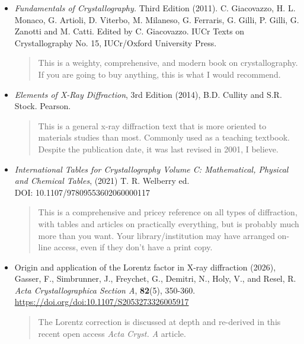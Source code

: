 \begin{itemize}
\item \textit{Fundamentals of Crystallography.} Third Edition (2011). C. Giacovazzo, H. L. Monaco, G. Artioli, D. Viterbo, M. Milaneso, G. Ferraris, G. Gilli, P. Gilli, G. Zanotti and M. Catti. Edited by C. Giacovazzo. IUCr Texts on Crystallography No. 15, IUCr/Oxford University Press.
\begin{quote}
This is a weighty, comprehensive, and modern book on crystallography. If you are going to buy anything, this is what I would recommend. 
\end{quote}

\item\textit{Elements of X-Ray Diffraction}, 3rd Edition (2014), B.D. Cullity and S.R. Stock. Pearson. 
\begin{quote}
This is a general x-ray diffraction text that is more oriented to materials studies than most. Commonly used as a teaching textbook. Despite the publication date, it was last revised in 2001, I believe.
\end{quote}

\item \textit{International Tables for Crystallography
Volume C: Mathematical, Physical and Chemical Tables}, (2021) T. R. Welberry ed.\\ 
DOI: 10.1107/97809553602060000117
\begin{quote}
This is a comprehensive and pricey reference on all types of diffraction, with tables and articles on practically everything, but is probably much more than you want. Your library/institution may have arranged on-line access, even if they don't have a print copy. 
\end{quote}

\item
Origin and application of the Lorentz factor in X-ray diffraction (2026), Gasser, F., Simbrunner, J., Freychet, G., Demitri, N., Holy, V., and Resel, R. \textit{Acta Crystallographica Section A}, \textbf{82}(5), 350-360. 
\url{https://doi.org/doi:10.1107/S2053273326005917} 
\begin{quote}
The Lorentz correction is discussed at depth and re-derived in this recent open access \textit{Acta Cryst. A} article.
\end{quote}

\end{itemize}
